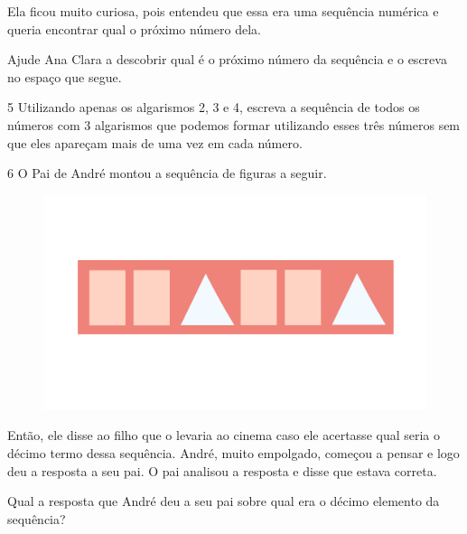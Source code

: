Ela ficou muito curiosa, pois entendeu que essa era uma sequência
numérica e queria encontrar qual o próximo número dela.

Ajude Ana Clara a descobrir qual é o próximo número da sequência e o escreva no espaço que segue.



\num{5} Utilizando apenas os algarismos 2, 3 e 4, escreva a sequência de
todos os números com 3 algarismos que podemos formar utilizando esses
três números sem que eles apareçam mais de uma vez em cada número.



\num{6} O Pai de André montou a sequência de figuras a seguir.

\begin{figure}[htpb!]
\includegraphics[width=\textwidth]{../ilustracoes/MAT5/SAEB_5ANO_MAT_figura28.png}
\end{figure}

Então, ele disse ao filho que o levaria ao cinema caso ele acertasse
qual seria o décimo termo dessa sequência. André, muito empolgado, começou a
pensar e logo deu a resposta a seu pai. O pai analisou a resposta e
disse que estava correta.

Qual a resposta que André deu a seu pai sobre qual era o décimo elemento da sequência?



